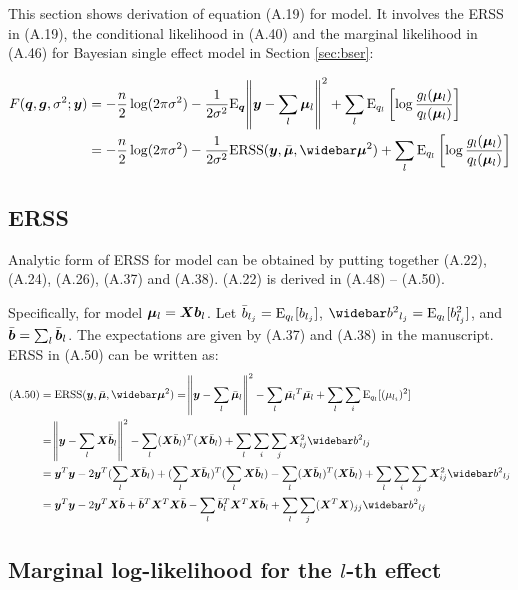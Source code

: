 This section shows derivation of equation (A.19) for \susie model. It involves the ERSS in (A.19), the conditional likelihood in (A.40) and the marginal likelihood in (A.46) for Bayesian single effect model in Section \ref{sec:bser}: 

\begin{align}
    F(\q,\g,\rv; \vy) &= -\frac{n}{2} \log(2\pi\rv) -\frac{1}{2\rv}\E_{\q}\norm{\vy-\sum_l \vmu_l}^2 + \sum_l \E_{q_l}\left[\log\frac{g_l(\vmu_l)}{q_l(\vmu_l)} \right] \label{eqn:Fexplicit}\\
    &= -\frac{n}{2} \log(2\pi\rv) - \frac{1}{2\rv} \ERSS(\vy,\emu,\emusq) + \sum_l \E_{q_l}\left[ \log\frac{g_l(\vmu_l)}{q_l(\vmu_l)} \right]  
\end{align}

\subsection{ERSS}

Analytic form of ERSS for \susie model can be obtained by putting together (A.22), (A.24), (A.26), (A.37) and (A.38). (A.22) is derived in (A.48) -- (A.50).

Specifically, for \susie model $\bm \mu_l = \bm X \bm b_l$. Let $\bar{b}_{l_j} = \text{E}_{q_l}[b_{l_j}]$, $\bbb_{l_j} = \E_{q_l}[b^2_{l_j}]$, and $\bar{\bm{b}} = \sum_l \bar{\bm{b}}_{l}$. The expectations are given by (A.37) and (A.38) in the manuscript. ERSS in (A.50) can be written as:
\begin{align}
    \text{(A.50)} &= \ERSS(\vy,\emu,\emusq) = \norm{\vy-\sum_l \emul}^2 - \sum_l \bar{\vmu_l}^T \bar{\vmu_l} + \sum_l \sum_i \E_{q_l}[(\mu_{l_i})^2] \\
    &= \norm{\vy-\sum_l \mx \vbb_l}^2 - \sum_l (\mx \vbb_l)^T (\mx \vbb_l) + \sum_l \sum_i \sum_{j} \mx_{ij}^{2}  \bbb_{lj} \\
    &= \vy^T\vy - 2 \vy^T (\sum_l \mx \vbb_l) + (\sum_l \mx \vbb_l)^T(\sum_l \mx \vbb_l) - \sum_l (\mx \vbb_l)^T (\mx \vbb_l) + \sum_l \sum_i \sum_{j} \mx_{ij}^{2}  \bbb_{lj} \\
    &= \vy^T\vy - 2 \vy^T\mx \bar{\vb} + \bar{\vb}^T \mx^T\mx \bar{\vb} - \sum_l \bar{\vb}_l^T \mx^T \mx \bar{\vb}_l + \sum_l \sum_j (\mx^T \mx)_{jj} \bbb_{lj} \label{eqn:erss}
\end{align}

\subsection{Marginal log-likelihood for the $l$-th effect}


